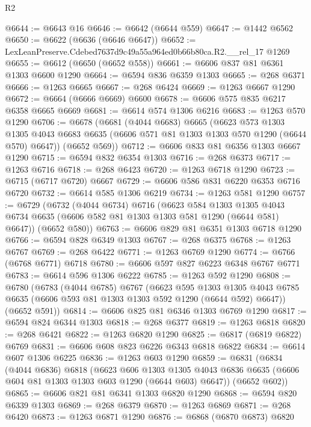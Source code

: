 \begin{lexlean}{R2}
\begin{coremodule}
@6644 := @6643 @16
@6646 := @6642 (@6644 @559)
@6647 := @1442 @6562
@6650 := @6622 (@6636 (@6646 @6647))
@6652 := LexLeanPreserve.Cdebed7637d9c49a55a964ed0b66b80ca.R2.__rel_17 @1269
@6655 := @6612 (@6650 (@6652 @558))
@6661 := @6606 @837 @81 @6361 @1303 @6600 @1290
@6664 := @6594 @836 @6359 @1303
@6665 := @268 @6371
@6666 := @1263 @6665
@6667 := @268 @6424
@6669 := @1263 @6667 @1290
@6672 := @6664 (@6666 @6669) @6600
@6678 := @6606 @575 @835 @6217 @6358 @6665 @6669
@6681 := @6614 @574 @1306 @6216
@6683 := @1263 @570 @1290
@6706 := @6678
    (@6681
      (@4044 @6683)
      @6665
      (@6623
        @573
        @1303
        @1305
        @4043
        @6683
        @6635
        (@6606 @571 @81 @1303 @1303 @570 @1290 (@6644 @570) @6647))
      (@6652 @569))
@6712 := @6606 @833 @81 @6356 @1303 @6667 @1290
@6715 := @6594 @832 @6354 @1303
@6716 := @268 @6373
@6717 := @1263 @6716
@6718 := @268 @6423
@6720 := @1263 @6718 @1290
@6723 := @6715 (@6717 @6720) @6667
@6729 := @6606 @586 @831 @6220 @6353 @6716 @6720
@6732 := @6614 @585 @1306 @6219
@6734 := @1263 @581 @1290
@6757 := @6729
    (@6732
      (@4044 @6734)
      @6716
      (@6623
        @584
        @1303
        @1305
        @4043
        @6734
        @6635
        (@6606 @582 @81 @1303 @1303 @581 @1290 (@6644 @581) @6647))
      (@6652 @580))
@6763 := @6606 @829 @81 @6351 @1303 @6718 @1290
@6766 := @6594 @828 @6349 @1303
@6767 := @268 @6375
@6768 := @1263 @6767
@6769 := @268 @6422
@6771 := @1263 @6769 @1290
@6774 := @6766 (@6768 @6771) @6718
@6780 := @6606 @597 @827 @6223 @6348 @6767 @6771
@6783 := @6614 @596 @1306 @6222
@6785 := @1263 @592 @1290
@6808 := @6780
    (@6783
      (@4044 @6785)
      @6767
      (@6623
        @595
        @1303
        @1305
        @4043
        @6785
        @6635
        (@6606 @593 @81 @1303 @1303 @592 @1290 (@6644 @592) @6647))
      (@6652 @591))
@6814 := @6606 @825 @81 @6346 @1303 @6769 @1290
@6817 := @6594 @824 @6344 @1303
@6818 := @268 @6377
@6819 := @1263 @6818
@6820 := @268 @6421
@6822 := @1263 @6820 @1290
@6825 := @6817 (@6819 @6822) @6769
@6831 := @6606 @608 @823 @6226 @6343 @6818 @6822
@6834 := @6614 @607 @1306 @6225
@6836 := @1263 @603 @1290
@6859 := @6831
    (@6834
      (@4044 @6836)
      @6818
      (@6623
        @606
        @1303
        @1305
        @4043
        @6836
        @6635
        (@6606 @604 @81 @1303 @1303 @603 @1290 (@6644 @603) @6647))
      (@6652 @602))
@6865 := @6606 @821 @81 @6341 @1303 @6820 @1290
@6868 := @6594 @820 @6339 @1303
@6869 := @268 @6379
@6870 := @1263 @6869
@6871 := @268 @6420
@6873 := @1263 @6871 @1290
@6876 := @6868 (@6870 @6873) @6820

\end{coremodule}
\end{lexlean}
